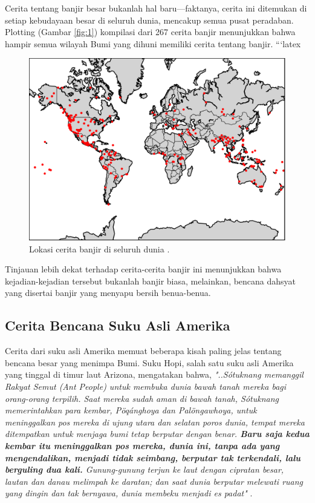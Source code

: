 \documentclass[10pt,twocolumn,letterpaper]{article}
\begin{document}
Cerita tentang banjir besar bukanlah hal baru—faktanya, cerita ini ditemukan di setiap kebudayaan besar di seluruh dunia, mencakup semua pusat peradaban. Plotting (Gambar \ref{fig:1}) kompilasi dari 267 cerita banjir \cite{3} menunjukkan bahwa hampir semua wilayah Bumi yang dihuni memiliki cerita tentang banjir.
```latex
\begin{figure}[h]
\begin{center}
   \includegraphics[width=1\linewidth]{b.png}
\end{center}
   \caption{Lokasi cerita banjir di seluruh dunia \cite{3}.}
\label{fig:1}
\label{fig:onecol}
\end{figure}

Tinjauan lebih dekat terhadap cerita-cerita banjir ini menunjukkan bahwa kejadian-kejadian tersebut bukanlah banjir biasa, melainkan, bencana dahsyat yang disertai banjir yang menyapu bersih benua-benua.

\subsection{Cerita Bencana Suku Asli Amerika}

Cerita dari suku asli Amerika memuat beberapa kisah paling jelas tentang bencana besar yang menimpa Bumi. Suku Hopi, salah satu suku asli Amerika yang tinggal di timur laut Arizona, mengatakan bahwa, \textit{"..Sótuknang memanggil Rakyat Semut (Ant People) untuk membuka dunia bawah tanah mereka bagi orang-orang terpilih. Saat mereka sudah aman di bawah tanah, Sótuknang memerintahkan para kembar, Pöqánghoya dan Palöngawhoya, untuk meninggalkan pos mereka di ujung utara dan selatan poros dunia, tempat mereka ditempatkan untuk menjaga bumi tetap berputar dengan benar. \textbf{Baru saja kedua kembar itu meninggalkan pos mereka, dunia ini, tanpa ada yang mengendalikan, menjadi tidak seimbang, berputar tak terkendali, lalu berguling dua kali.} Gunung-gunung terjun ke laut dengan cipratan besar, lautan dan danau melimpah ke daratan; dan saat dunia berputar melewati ruang yang dingin dan tak bernyawa, dunia membeku menjadi es padat"} \cite{4}.
\end{document}
